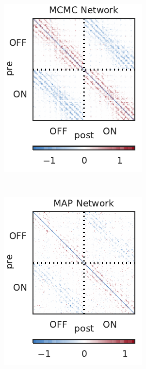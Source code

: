 \begin{figure}[t!]
\begin{subfigure}[b]{1.8in}
    \includegraphics[width=\textwidth]{figures/ch5/synth_rgc_mcmc_conn.pdf}
    \label{fig:synth_rgc_mcmc_conn}
  \end{subfigure}
  ~
  \begin{subfigure}[b]{1.8in}
    \centering
    \caption{}
    \vspace{-.25in}
    \includegraphics[width=\textwidth]{figures/ch5/synth_rgc_bfgs_conn.pdf}

\end{subfigure}
\end{figure}
